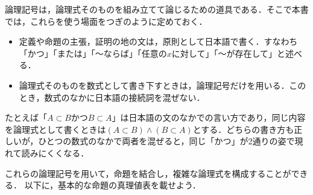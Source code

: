 \begin{remark}
  論理記号は，論理式そのものを組み立てて論じるための道具である．そこで本書では，これらを使う場面をつぎのように定めておく．
  \begin{itemize}
    \item 定義や命題の主張，証明の地の文は，原則として日本語で書く．すなわち「かつ」「または」「〜ならば」「任意の$x$に対して」「〜が存在して」と述べる．
    \item 論理式そのものを数式として書き下すときは，論理記号だけを用いる．このとき，数式のなかに日本語の接続詞を混ぜない．
  \end{itemize}
  たとえば「$A \subset B$かつ$B \subset A$」は日本語の文のなかでの言い方であり，同じ内容を論理式として書くときは$(A \subset B) \land (B \subset A)$とする．どちらの書き方も正しいが，ひとつの数式のなかで両者を混ぜると，同じ「かつ」が2通りの姿で現れて読みにくくなる．
\end{remark}

これらの論理記号を用いて，命題を結合し，複雑な論理式を構成することができる．
以下に，基本的な命題の真理値表を載せよう．

